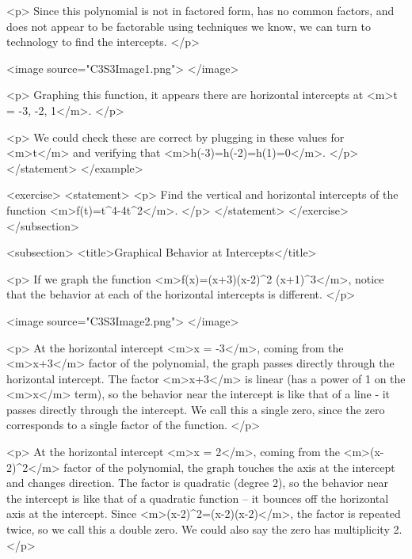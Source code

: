                 <p>
                    Since this polynomial is not in factored form, has no common factors, and does not appear to be factorable using techniques we know, we can turn to technology to find the intercepts.
                </p>

                <image source="C3S3Image1.png">
                </image>

                <p>
                    Graphing this function, it appears there are horizontal intercepts at <m>t = -3, -2, 1</m>.
                </p>

                <p>
                    We could check these are correct by plugging in these values for <m>t</m> and verifying that <m>h(-3)=h(-2)=h(1)=0</m>.
                </p>
            </statement>
        </example>

        <exercise>
            <statement>
                <p>
                    Find the vertical and horizontal intercepts of the function <m>f(t)=t^{4}-4t^{2}</m>.
                </p>
            </statement>
        </exercise>
    </subsection>


    <subsection>
        <title>Graphical Behavior at Intercepts</title>

        <p>
            If we graph the function <m>f(x)=(x+3)(x-2)^{2} (x+1)^{3}</m>, notice that the behavior at each of the horizontal intercepts is different.
        </p>

        <image source="C3S3Image2.png">
        </image>

        <p>
            At the horizontal intercept <m>x = -3</m>, coming from the <m>x+3</m> factor of the polynomial, the graph passes directly through the horizontal intercept.
            The factor <m>x+3</m> is linear (has a power of 1 on the <m>x</m> term), so the behavior near the intercept is like that of a line - it passes directly through the intercept.
            We call this a single zero, since the zero corresponds to a single factor of the function.
        </p>

        <p>
            At the horizontal intercept <m>x = 2</m>, coming from the <m>(x-2)^{2}</m> factor of the polynomial, the graph touches the axis at the intercept and changes direction.
            The factor is quadratic (degree 2), so the behavior near the intercept is like that of a quadratic function – it bounces off the horizontal axis at the intercept.
            Since <m>(x-2)^{2}=(x-2)(x-2)</m>, the factor is repeated twice, so we call this a double zero.
            We could also say the zero has multiplicity 2.
        </p>

